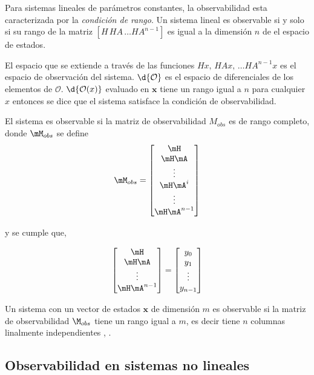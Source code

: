 Para sistemas lineales de parámetros constantes, la observabilidad esta caracterizada por la \textit{condición de rango}.
Un sistema lineal es observable si y solo si su rango de la matriz
$[H\,HA\, \ldots HA^{n-1} ]$ es igual a la dimensión $n$ de el espacio de estados.

El espacio que se extiende a través de las funciones $Hx,\,HAx,\, \ldots HA^{n-1}x$ es el espacio de observación del sistema.
$\d{\mathcal{O}}$ es el espacio de diferenciales de los elementos de $\mathcal{O}$.
$\d{\mathcal{O}(x)}$ evaluado en $\mathbf{x}$ tiene un rango igual a $n$ para cualquier $x$
entonces se dice que el sistema satisface la condición de observabilidad.

El sistema es observable si la matriz de observabilidad $M_{obs}$ es de rango completo,
donde $\mM_{obs}$ se define
\begin{equation}
	\mM_{obs}=
	\begin{bmatrix} 
		\mH\\
		\mH \mA\\
		\vdots\\
		\mH \mA^i\\
		\vdots\\
		\mH \mA^{n-1}
		\end{bmatrix}
		\label{obsmatrix}
\end{equation}

y se cumple que,

\begin{equation}
\begin{bmatrix} 
\mH\\
\mH \mA\\
\vdots\\
\mH \mA^{n-1}
\end{bmatrix} =
\begin{bmatrix} 
y_0\\
y_1\\
\vdots\\
y_{n-1}
\end{bmatrix}
\end{equation}


Un sistema con un vector de estados $\mathbf{x}$ de dimensión $m$ es observable si la matriz de observabilidad $\M_{obs}$ tiene un rango igual a $m$,
es decir tiene $n$ columnas linalmente independientes \cite{Ogata2010}, \cite{Sinha2007}.

\subsection{Observabilidad en sistemas no lineales}
\label{subsec:nolinealobs}

